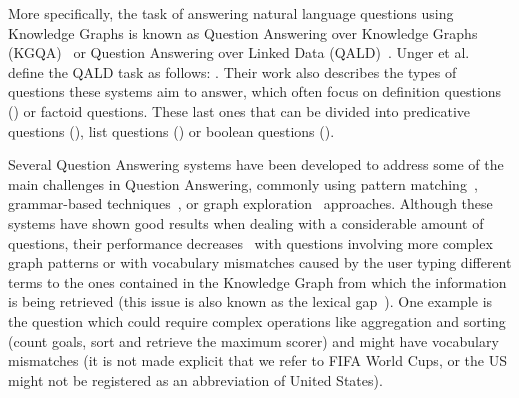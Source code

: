 More specifically, the task of answering natural language questions using Knowledge Graphs 
is known as Question Answering over Knowledge Graphs (KGQA)~\cite{qa:nn-qakg-Chakraborty19} or Question 
Answering over Linked Data (QALD)~\cite{qa:intro-UngerFC14, qa:qald-Lopezetal2013}. Unger et 
al.~\cite{qa:intro-UngerFC14} define the QALD task as follows: . Their work also describes the types of questions these systems 
aim to answer, which often focus on definition questions () or factoid 
questions. These last ones that can be divided into predicative questions (), list questions () or boolean questions 
(). 

Several Question Answering systems have been developed to address some of the main 
challenges in Question Answering, commonly using pattern matching~\cite{qa:pattern-FaderZE13, 
qa:pattern-LopezFMS12}, grammar-based techniques~\cite{qa:grammar-DamljanovicAC10, 
qa:grammar-2-Marginean17}, or graph exploration~\cite{qa:graph-XuFZ14, qa:graph-2-ZouHWYHZ14} 
approaches. Although these systems have shown good results when dealing with a considerable amount of 
questions, their performance decreases~\cite{qa:challenges-semweb-HoffnerWMULN17} with questions 
involving more complex graph patterns or with vocabulary mismatches caused by the user typing 
different terms to the ones contained in the Knowledge Graph from which the information is being 
retrieved (this issue is also known as the lexical gap~\cite{semPar:lexical-gap-HakimovUWC15}). One 
example is the question  which could 
require complex operations like aggregation and sorting (count goals, sort and retrieve the maximum 
scorer) and might have vocabulary mismatches (it is not made explicit that we refer to FIFA World 
Cups, or the US might not be registered as an abbreviation of United States).

